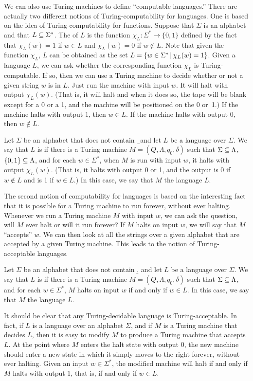 We can also use Turing machines to define ``computable languages.''
There are actually two different notions of Turing-computability
for languages.  One is based on the idea of Turing-computability
for functions.  Suppose that $\Sigma$ is an alphabet and that
$L\subseteq\Sigma^*$.  The  of $L$
is the function $\chi_L\colon\Sigma^*\to\{0,1\}$ defined
by the fact that $\chi_L(w)=1$ if $w\in L$ and $\chi_L(w)=0$
if $w\not\in L$.  Note that given the function $\chi_L$,
$L$ can be obtained as the set $L=\{w\in\Sigma^*\,|\, \chi_L(w)=1\}$.
Given a language $L$, we can ask whether the corresponding function
$\chi_L$ is Turing-computable.  If so, then we can use a Turing
machine to decide whether or not a given string $w$ is in $L$.
Just run the machine with input $w$.  It will halt with output $\chi_L(w)$.
(That is, it will halt and when it does so, the tape will be blank except for
a 0 or a 1, and the machine will be positioned on the 0 or~1.)
If the machine halts with output 1, then $w\in L$.  If the machine halts with
output 0, then $w\not\in L$.
\begin{definition}
Let $\Sigma$ be an alphabet that does not contain \b\ and let $L$ be a language over $\Sigma$.
We say that $L$ is  if there is a Turing machine
$M=(Q,\Lambda,q_0,\delta)$ such that $\Sigma\subseteq\Lambda$, $\{0,1\}\subseteq\Lambda$,
and for each $w\in\Sigma^*$, when $M$ is run with input $w$, it halts
with output $\chi_L(w)$.  (That is, it halts with output 0 or 1, and
the output is 0 if $w\not\in L$ and is 1 if $w\in L$.)  In this case,
we say that $M$  the language $L$.
\end{definition}

The second notion of computability for languages is based on the
interesting fact that it is possible for a Turing machine to run
forever, without ever halting.
Whenever we run a Turing machine $M$ with input $w$,
we can ask the question, will $M$ ever halt or will it run forever?  If $M$
halts on input $w$, we will say that $M$ ``accepts'' $w$.  We can then
look at all the strings over a given alphabet that are accepted by
a given Turing machine.  This leads to the notion of Turing-acceptable
languages.
\begin{definition}
Let $\Sigma$ be an alphabet that does not contain \b, and let $L$ be a language over $\Sigma$.
We say that $L$ is  if there is a Turing machine
$M=(Q,\Lambda,q_0,\delta)$ such that $\Sigma\subseteq\Lambda$, and
for each $w\in\Sigma^*$, $M$ halts on input $w$ if and only if $w\in L$.
In this case, we say that $M$  the language $L$.
\end{definition}

It should be clear that any Turing-decidable language is Turing-acceptable.
In fact, if $L$ is a language over an alphabet $\Sigma$,
and if $M$ is a Turing machine that
decides $L$, then it is easy to modify $M$ to produce a Turing machine
that accepts $L$.  At the point where $M$ enters the halt state with
output 0, the new machine should enter a new state in which it simply
moves to the right forever, without ever halting.  Given an input
$w\in\Sigma^*$, the modified machine will halt if and only if $M$
halts with output 1, that is, if and only if $w\in L$.

